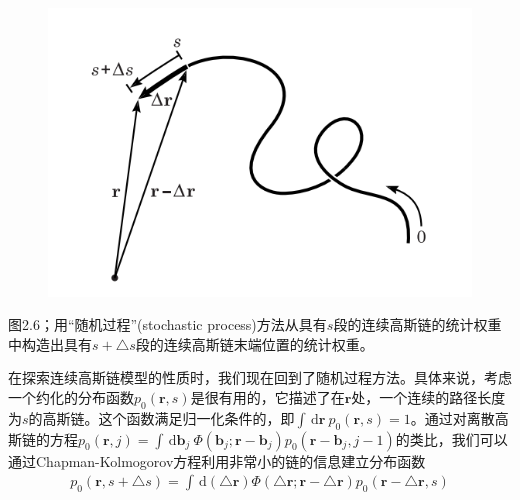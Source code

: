 \begin{figure}[H]
\centering
\includegraphics[scale=0.7]{./figures/42.png}
\caption{}
\end{figure}

图2.6；用“随机过程”(stochastic process)方法从具有$s$段的连续高斯链的统计权重中构造出具有$s+\bigtriangleup s$段的连续高斯链末端位置的统计权重。

在探索连续高斯链模型的性质时，我们现在回到了随机过程方法。具体来说，考虑一个约化的分布函数$p_0 (\mathbf{r},s)$是很有用的，它描述了在$\mathbf {r}$处，一个连续的路径长度为$s$的高斯链。这个函数满足归一化条件的，即$\int \, \mathrm{d} \mathbf{r}~p_0(\mathbf{r},s)=1$。通过对离散高斯链的方程$p_0(\mathbf{r},j)=\int \, \mathrm{d} \mathbf{b}_j~\Phi(\mathbf{b}_j;\mathbf{r}-\mathbf{b}_j)p_0(\mathbf{r}-\mathbf{b}_j,j-1)$的类比，我们可以通过Chapman-Kolmogorov方程利用非常小的链的信息建立分布函数
\begin{gather}
p_0(\mathbf{r},s+\bigtriangleup s)=\int \, \mathrm{d}(\bigtriangleup \mathbf{r})\Phi(\bigtriangleup \mathbf{r};\mathbf{r}-\bigtriangleup \mathbf{r})p_0(\mathbf{r}-\bigtriangleup \mathbf{r},s)
\end{gather}

